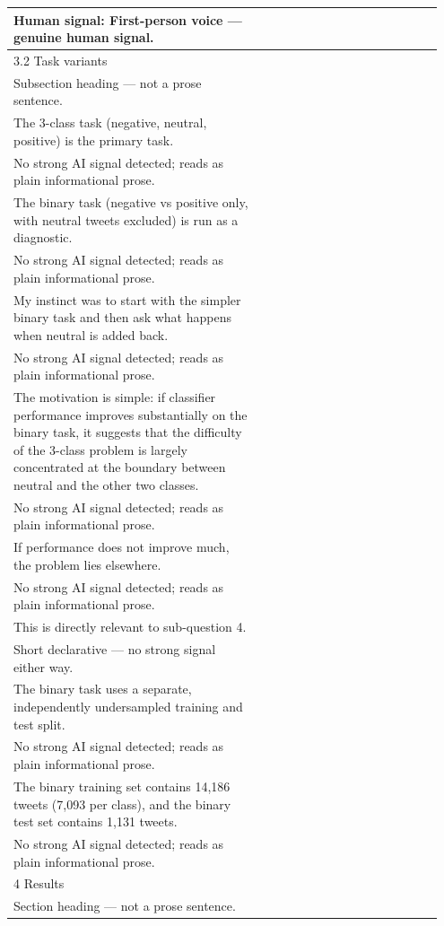 \documentclass[11pt]{article}
\begin{document}
\begin{longtable}{|p{0.55\linewidth}|p{0.40\linewidth}|}
\hline
Human signal: First-person voice --- genuine human signal. & \\
\hline
3.2 Task variants & \\[2pt]
\hline
Subsection heading --- not a prose sentence. & \\
\hline
The 3-class task (negative, neutral, positive) is the primary task. & \\[2pt]
\hline
No strong AI signal detected; reads as plain informational prose. & \\
\hline
The binary task (negative vs positive only, with neutral tweets excluded) is run as a diagnostic. & \\[2pt]
\hline
No strong AI signal detected; reads as plain informational prose. & \\
\hline
My instinct was to start with the simpler binary task and then ask what happens when neutral is added back. & \\[2pt]
\hline
No strong AI signal detected; reads as plain informational prose. & \\
\hline
The motivation is simple: if classifier performance improves substantially on the binary task, it suggests that the difficulty of the 3-class problem is largely concentrated at the boundary between neutral and the other two classes. & \\[2pt]
\hline
No strong AI signal detected; reads as plain informational prose. & \\
\hline
If performance does not improve much, the problem lies elsewhere. & \\[2pt]
\hline
No strong AI signal detected; reads as plain informational prose. & \\
\hline
This is directly relevant to sub-question 4. & \\[2pt]
\hline
Short declarative --- no strong signal either way. & \\
\hline
The binary task uses a separate, independently undersampled training and test split. & \\[2pt]
\hline
No strong AI signal detected; reads as plain informational prose. & \\
\hline
The binary training set contains 14,186 tweets (7,093 per class), and the binary test set contains 1,131 tweets. & \\[2pt]
\hline
No strong AI signal detected; reads as plain informational prose. & \\
\hline
4 Results & \\[2pt]
\hline
Section heading --- not a prose sentence. & \\

\end{longtable}
\end{document}
